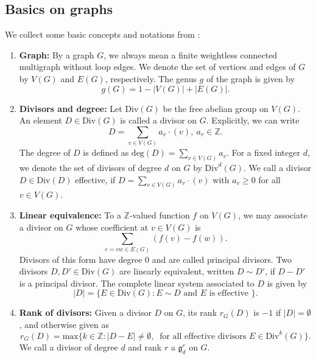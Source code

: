 \documentclass[11pt]{amsart}
\begin{document}
\subsection{Basics on graphs}\label{subsec:basics} 
We collect some basic concepts and notations from \cite{MR2448666}:
\begin{enumerate}
 \item \textbf{Graph:} By a graph $G$, we always mean a finite weightless connected multigraph without loop edges. We denote the set of vertices and edges of $G$ by $V(G)$ and $E(G)$, respectively. The genus $g$ of the graph is given by $$g(G)=1-|V(G)|+|E(G)|.$$
 \item \textbf{Divisors and degree:} Let $\mathrm{Div}(G)$ be the free abelian group on $V(G)$. An element $D\in\mathrm{Div}(G)$ is called a divisor on $G$. Explicitly, we can write $$D=\sum_{v\in V(G)}a_v\cdot (v),\ a_v\in\mathbb{Z}.$$ The degree of $D$ is defined as $\mathrm{deg}(D)=\sum_{v\in V(G)}a_v$. For a fixed integer $d$, we denote the set of divisors of degree $d$ on $G$ by $\mathrm{Div}^d(G)$.
We call a divisor $D\in\mathrm{Div}(D)$ effective, if $D=\sum_{v\in V(G)} a_v\cdot(v)$ with $a_v\geq0$ for all $v\in V(G)$. 
 \item \textbf{Linear equivalence:} To a $\mathbb{Z}$-valued function $f$ on $V(G)$, we may associate a divisor on $G$ whose coefficient at $v \in V(G)$ is $$\sum_{e=vw\in E(G)}(f(v)-f(w)).$$
 Divisors of this form have degree $0$ and are called principal divisors. Two divisors $D,D'\in \mathrm{Div}(G)$ are linearly equivalent, written $D\sim D'$, if $D-D'$ is a principal divisor. The complete linear system associated to $D$ is given by $$|D|=\{E\in\mathrm{Div}(G)\colon E\sim D \text{ and } E \text{ is effective } \}.$$
 \item \textbf{Rank of divisors:} Given a divisor $D$ on $G$, its rank $r_G(D)$ is $-1$ if $|D|=\emptyset$, and otherwise given as $$r_G(D)=\mathrm{max}\{k\in\mathbb{Z}\colon |D-E| \neq \emptyset,\ \text{ for all effective divisors } E\in\mathrm{Div}^k(G)\}.$$
 We call a divisor of degree $d$ and rank $r$ a $\mathfrak g_d^r$ on $G$.
\end{enumerate}
\end{document}
